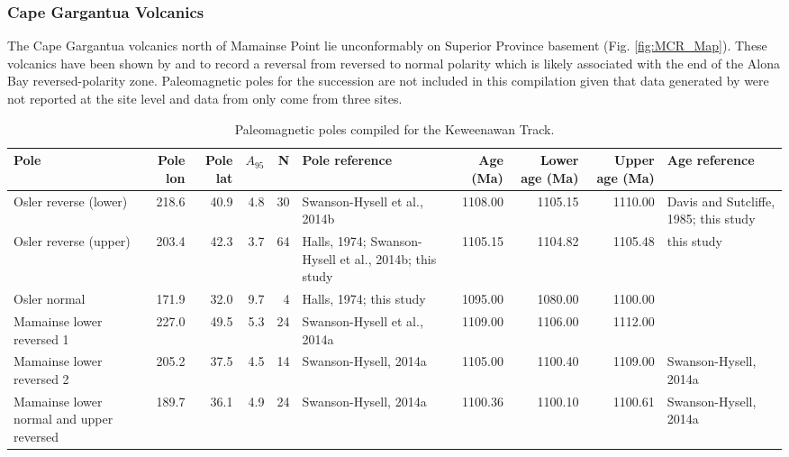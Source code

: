 \documentclass[11pt,letterpaper]{article}
\begin{document}
\subsubsection{Cape Gargantua Volcanics}

The Cape Gargantua volcanics north of Mamainse Point lie unconformably on Superior Province basement (Fig. \ref{fig:MCR_Map}). These volcanics have been shown by \cite{Palmer1970a} and \cite{Robertson1973a} to record a reversal from reversed to normal polarity which is likely associated with the end of the Alona Bay reversed-polarity zone. Paleomagnetic poles for the succession are not included in this compilation given that data generated by \cite{Palmer1970a} were not reported at the site level and data from \cite{Robertson1973a} only come from three sites.

\begin{landscape}
\begin{table}
\caption[Keweenawan track poles]{Paleomagnetic poles compiled for the Keweenawan Track.}
\scriptsize
\begin{tabular}{p{3.5 cm}rrrrp{3.5 cm}rrrp{3.5 cm}}
\toprule
                                           Pole &  Pole lon &  Pole lat &  $A_{95}$ &   N &                                               Pole reference &  Age (Ma) &  Lower age (Ma) &  Upper age (Ma) &                                  Age reference \\
\midrule
 Osler reverse (lower) &  218.6 &  40.9 &  4.8 &  30 &  Swanson-Hysell et al., 2014b &  1108.00 &  1105.15 &  1110.00 &  Davis and Sutcliffe, 1985; this study \\
 \midrule
 Osler reverse (upper) &  203.4 &  42.3 &  3.7 &  64 &  Halls, 1974; Swanson-Hysell et al., 2014b; this study &  1105.15 &  1104.82 &  1105.48 &  this study \\
 \midrule
 Osler normal &  171.9 &  32.0 &  9.7 &  4 &  Halls, 1974; this study &  1095.00 &  1080.00 &  1100.00 &   \\
 \midrule
 Mamainse lower reversed 1 &  227.0 &  49.5 &  5.3 &  24 &  Swanson-Hysell et al., 2014a &  1109.00 &  1106.00 &  1112.00 &   \\
 \midrule
 Mamainse lower reversed 2 &  205.2 &  37.5 &  4.5 &  14 &  Swanson-Hysell, 2014a &  1105.00 &  1100.40 &  1109.00 &  Swanson-Hysell, 2014a \\
 \midrule
 Mamainse lower normal and upper reversed &  189.7 &  36.1 &  4.9 &  24 &  Swanson-Hysell, 2014a &  1100.36 &  1100.10 &  1100.61 &  Swanson-Hysell, 2014a \\

\end{tabular}
\end{table}
\end{landscape}
\end{document}
